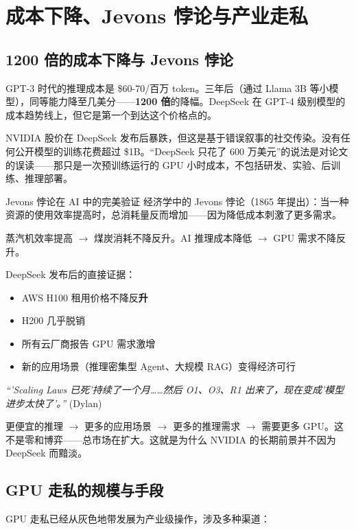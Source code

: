 \section{成本下降、Jevons 悖论与产业走私}

\subsection{1200 倍的成本下降与 Jevons 悖论}

GPT-3 时代的推理成本是 \$60-70/百万 token。三年后（通过 Llama 3B 等小模型），同等能力降至几美分——\textbf{1200 倍}的降幅。DeepSeek 在 GPT-4 级别模型的成本趋势线上，但它是第一个到达这个价格点的。

NVIDIA 股价在 DeepSeek 发布后暴跌，但这是基于错误叙事的社交传染。没有任何公开模型的训练花费超过 \$1B。``DeepSeek 只花了 600 万美元''的说法是对论文的误读——那只是一次预训练运行的 GPU 小时成本，不包括研发、实验、后训练、推理部署。

\begin{importantbox}{Jevons 悖论在 AI 中的完美验证}
经济学中的 Jevons 悖论（1865 年提出）：当一种资源的使用效率提高时，总消耗量反而增加——因为降低成本刺激了更多需求。

蒸汽机效率提高 $\to$ 煤炭消耗不降反升。AI 推理成本降低 $\to$ GPU 需求不降反升。

DeepSeek 发布后的直接证据：
\begin{itemize}
    \item AWS H100 租用价格不降反\textbf{升}
    \item H200 几乎脱销
    \item 所有云厂商报告 GPU 需求激增
    \item 新的应用场景（推理密集型 Agent、大规模 RAG）变得经济可行
\end{itemize}

\textit{``'Scaling Laws 已死'持续了一个月……然后 O1、O3、R1 出来了，现在变成'模型进步太快了'。''} (Dylan)

更便宜的推理 $\to$ 更多的应用场景 $\to$ 更多的推理需求 $\to$ 需要更多 GPU。这不是零和博弈——总市场在扩大。这就是为什么 NVIDIA 的长期前景并不因为 DeepSeek 而黯淡。
\end{importantbox}

\subsection{GPU 走私的规模与手段}

GPU 走私已经从灰色地带发展为产业级操作，涉及多种渠道：

